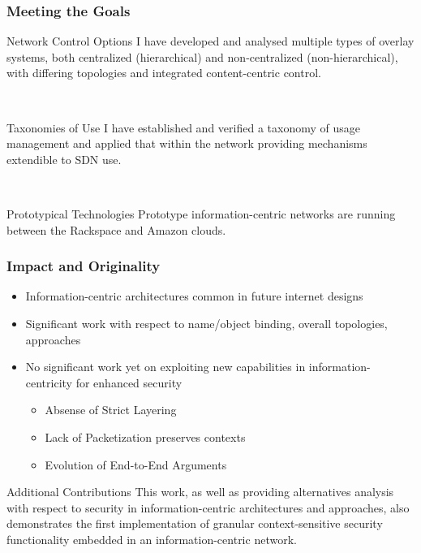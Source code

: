 \documentclass[t,handout]{beamer}
\begin{document}
\begin{frame}
\frametitle{Meeting the Goals}
\begin{beamerboxesrounded}[shadow]{Network Control Options}
{\small I have developed and analysed multiple types of overlay systems, both centralized (hierarchical) and non-centralized (non-hierarchical), with differing topologies and integrated content-centric control.}
\end{beamerboxesrounded}
~\\
\begin{beamerboxesrounded}[shadow]{Taxonomies of Use}
{\small I have established and verified a taxonomy of usage management and applied that within the network providing mechanisms extendible to SDN use.}
\end{beamerboxesrounded}
~\\
\begin{beamerboxesrounded}[shadow]{Prototypical Technologies}
{\small Prototype information-centric networks are running between the Rackspace and Amazon clouds.}
\end{beamerboxesrounded}
\end{frame}

\begin{frame}
\frametitle{Impact and Originality}
\begin{itemize}
\item Information-centric architectures common in future internet designs
\item Significant work with respect to name/object binding, overall topologies, approaches
\item No significant work yet on exploiting new capabilities in information-centricity for enhanced security
\begin{itemize}
\item {\small Absense of Strict Layering}
\item {\small Lack of Packetization preserves contexts} 
\item {\small Evolution of End-to-End Arguments}
\end{itemize}
\end{itemize}
\begin{beamerboxesrounded}[shadow]{Additional Contributions}
{\small This work, as well as providing alternatives analysis with respect to security in information-centric architectures and approaches, also demonstrates the first implementation of granular context-sensitive security functionality embedded in an information-centric network.}
\end{beamerboxesrounded}
\end{frame}
\end{document}
